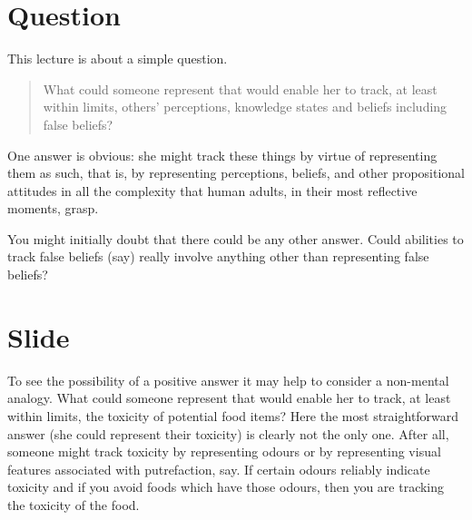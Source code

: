 \documentclass[12pt,\papersize]{extarticle}
\begin{document}
\setlength\footnotesep{1em}




\maketitle
%
%
%



\section{Question}
This lecture is about a simple question.
\begin{quote}
What could someone represent that would enable her to track, at least within limits, others' perceptions, knowledge states and beliefs including false beliefs? 
\end{quote}
%
One answer is obvious: she might track these things by virtue of representing them as such, that is, by representing perceptions, beliefs, and other propositional attitudes in all the complexity that human adults, in their most reflective moments, grasp.

You might initially doubt that there could be any other answer.
Could abilities to track false beliefs (say) really involve anything other than representing false beliefs?

\section{Slide}
To see the possibility of a positive answer it may help to consider a non-mental analogy.
What could someone represent that would enable her to track, at least within limits, the toxicity of potential food items?
Here the most straightforward answer (she could represent their toxicity) is clearly not the only one.
After all, someone might track toxicity by representing odours or by representing visual features associated with putrefaction, say.
If certain odours reliably indicate toxicity and if you avoid foods which have those odours,
then you are tracking the toxicity of the food.
\end{document}

